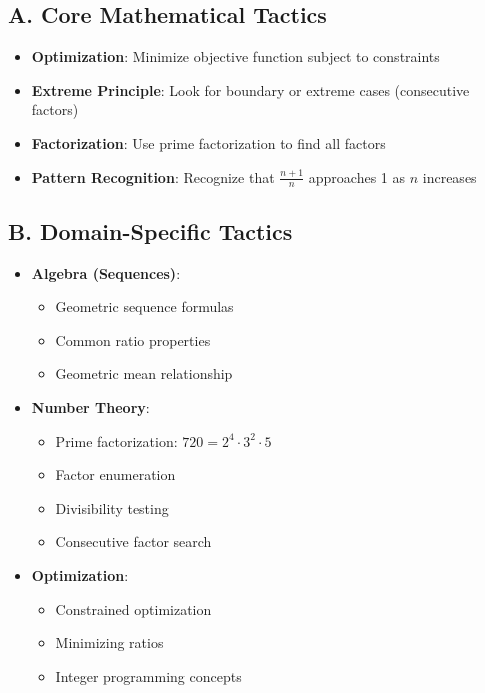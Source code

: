 \documentclass[11pt]{article}
\begin{document}
\begin{tacticalbox}
\subsection*{A. Core Mathematical Tactics}
\begin{itemize}[leftmargin=*]
    \item \textbf{Optimization}: Minimize objective function subject to constraints
    
    \item \textbf{Extreme Principle}: Look for boundary or extreme cases (consecutive factors)
    
    \item \textbf{Factorization}: Use prime factorization to find all factors
    
    \item \textbf{Pattern Recognition}: Recognize that $\frac{n+1}{n}$ approaches 1 as $n$ increases
\end{itemize}

\subsection*{B. Domain-Specific Tactics}
\begin{itemize}[leftmargin=*]
    \item \textbf{Algebra (Sequences)}: 
    \begin{itemize}
        \item Geometric sequence formulas
        \item Common ratio properties
        \item Geometric mean relationship
    \end{itemize}
    
    \item \textbf{Number Theory}: 
    \begin{itemize}
        \item Prime factorization: $720 = 2^4 \cdot 3^2 \cdot 5$
        \item Factor enumeration
        \item Divisibility testing
        \item Consecutive factor search
    \end{itemize}
    
    \item \textbf{Optimization}: 
    \begin{itemize}
        \item Constrained optimization
        \item Minimizing ratios
        \item Integer programming concepts
    \end{itemize}
\end{itemize}


\end{tacticalbox}
\end{document}

